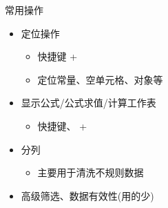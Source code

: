 \begin{frame}{常用操作}
	\begin{itemize}
		\item<+-> 定位操作
		
		\begin{itemize}
			\item 快捷键 + 
			\item 定位常量、空单元格、对象等
		\end{itemize}
		
		\item<+-> 显示公式/公式求值/计算工作表
		
		\begin{itemize}
			\item 快捷键、 + 
		\end{itemize}
	
		\item<+-> 分列
		
		\begin{itemize}
			\item 主要用于清洗不规则数据
		\end{itemize}
		\item<+-> \alert{高级筛选、数据有效性(用的少)}
	\end{itemize}
\end{frame}


